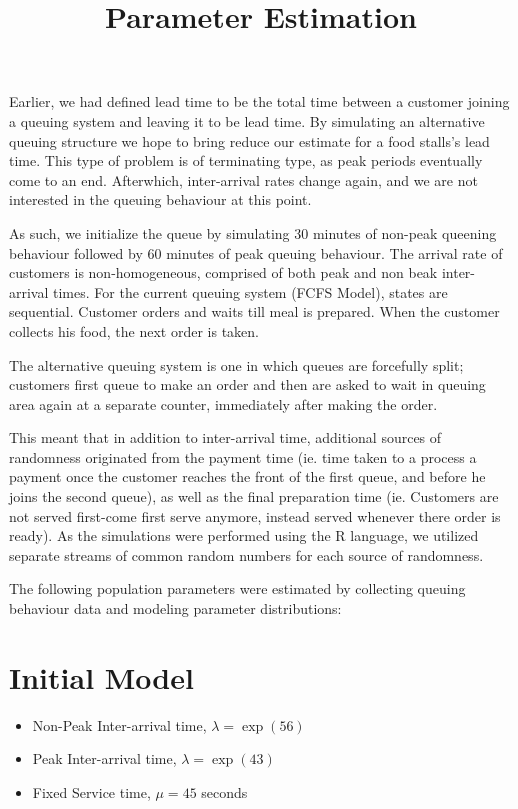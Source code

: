 \documentclass{article}
\begin{document}
\pagecolor{ultramarine}

\title{Parameter Estimation}
\author{}
\date{}
\maketitle
Earlier, we had defined lead time to be the total time between a customer joining a queuing system and leaving it to be lead time. By simulating an alternative queuing structure we hope to bring reduce our estimate for a food stalls's lead time. This type of problem is of terminating type, as peak periods eventually come to an end. Afterwhich, inter-arrival rates change again, and we are not interested in the queuing behaviour at this point.
\newline

As such, we initialize the queue by simulating 30 minutes of non-peak queening behaviour followed by 60 minutes of peak queuing behaviour. The arrival rate of customers is non-homogeneous, comprised of both peak and non beak inter-arrival times.
\newline
For the current queuing system (FCFS Model), states are sequential. Customer orders and waits till meal is prepared. When the customer collects his food, the next order is taken.
\newline

The alternative queuing system is one in which queues are forcefully split; customers first queue to make an order and then are asked to wait in queuing area again at a separate counter, immediately after making the order. 
\newline

This meant that in addition to inter-arrival time, additional sources of randomness originated from the payment time (ie. time taken to a process a payment once the customer reaches the front of the first queue, and before he joins the second queue), as well as the final preparation time (ie. Customers are not served first-come first serve anymore, instead served whenever there order is ready). As the simulations were performed using the R language, we utilized separate streams of common random numbers for each source of randomness.
\newline

The following population parameters were estimated by collecting queuing behaviour data and modeling parameter distributions:
\section*{Initial Model}
\begin{itemize}
    \item Non-Peak Inter-arrival time, $\lambda = \exp(56)$
    \item Peak Inter-arrival time, $\lambda = \exp(43)$
    \item Fixed Service time, $\mu = 45$ seconds
\end{itemize}
\end{document}
